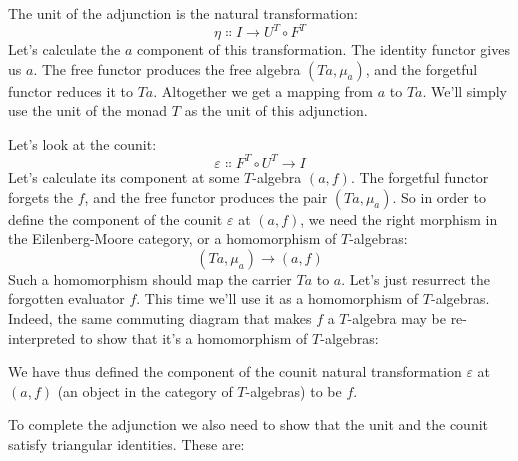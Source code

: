 The unit of the adjunction is the natural transformation:
\[\eta \Colon I \to U^T \circ F^T\]
Let's calculate the $a$ component of this transformation. The
identity functor gives us $a$. The free functor produces the free
algebra $(T a, \mu_a)$, and the forgetful functor reduces it to
$T a$. Altogether we get a mapping from $a$ to
$T a$. We'll simply use the unit of the monad $T$ as the
unit of this adjunction.

Let's look at the counit:
\[\varepsilon \Colon F^T \circ U^T \to I\]
Let's calculate its component at some $T$-algebra $(a, f)$. The
forgetful functor forgets the $f$, and the free functor produces
the pair $(T a, \mu_a)$. So in order to define the component of
the counit $\varepsilon$ at $(a, f)$, we need the right morphism in
the Eilenberg-Moore category, or a homomorphism of $T$-algebras:
\[(T a, \mu_a) \to (a, f)\]
Such a homomorphism should map the carrier $T a$ to $a$.
Let's just resurrect the forgotten evaluator $f$. This time we'll
use it as a homomorphism of $T$-algebras. Indeed, the same commuting
diagram that makes $f$ a $T$-algebra may be re-interpreted to show
that it's a homomorphism of $T$-algebras:

\begin{figure}[H]
  \centering
\end{figure}

\noindent
We have thus defined the component of the counit natural transformation
$\varepsilon$ at $(a, f)$ (an object in the category of $T$-algebras)
to be $f$.

To complete the adjunction we also need to show that the unit and the
counit satisfy triangular identities. These are:

\begin{figure}[H]
  \centering
  \begin{subfigure}
    \centering
  \end{subfigure}%
  \hspace{1cm}
  \begin{subfigure}
    \centering
  \end{subfigure}
\end{figure}

